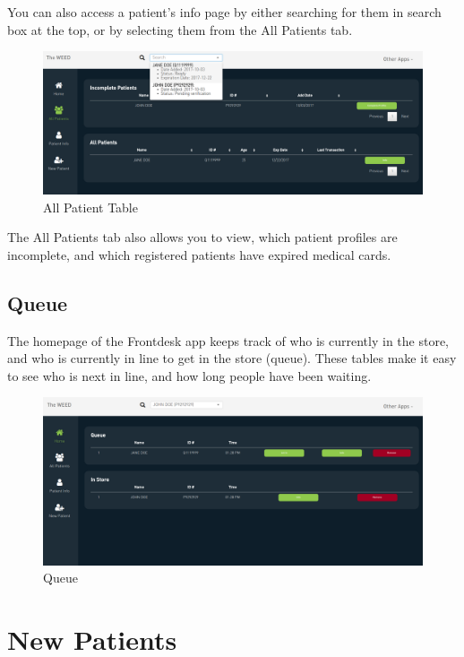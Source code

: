 \documentclass[]{book}
\theoremstyle{definition}
\theoremstyle{definition}
\theoremstyle{definition}
\theoremstyle{remark}
\begin{document}
You can also access a patient's info page by either searching for them
in search box at the top, or by selecting them from the All Patients
tab.

\begin{figure}
\centering
\includegraphics{images/allPatients.png}
\caption{All Patient Table}
\end{figure}

The All Patients tab also allows you to view, which patient profiles are
incomplete, and which registered patients have expired medical cards.

\subsection{Queue}\label{queue}

The homepage of the Frontdesk app keeps track of who is currently in the
store, and who is currently in line to get in the store (queue). These
tables make it easy to see who is next in line, and how long people have
been waiting.

\begin{figure}
\centering
\includegraphics{images/queue.png}
\caption{Queue}
\end{figure}

\section{New Patients}\label{new-patients}
\end{document}
